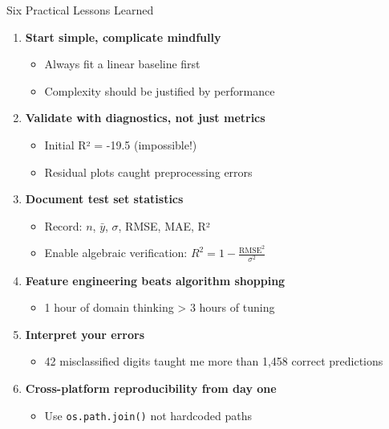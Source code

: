 \documentclass[aspectratio=169]{beamer}
\begin{document}
\begin{frame}{Six Practical Lessons Learned}

\begin{enumerate}
\item \textbf{Start simple, complicate mindfully}
\begin{itemize}
\item Always fit a linear baseline first
\item Complexity should be justified by performance
\end{itemize}

\item \textbf{Validate with diagnostics, not just metrics}
\begin{itemize}
\item Initial R² = -19.5 (impossible!)
\item Residual plots caught preprocessing errors
\end{itemize}

\item \textbf{Document test set statistics}
\begin{itemize}
\item Record: $n$, $\bar{y}$, $\sigma$, RMSE, MAE, R²
\item Enable algebraic verification: $R^2 = 1 - \frac{\text{RMSE}^2}{\sigma^2}$
\end{itemize}

\item \textbf{Feature engineering beats algorithm shopping}
\begin{itemize}
\item 1 hour of domain thinking > 3 hours of tuning
\end{itemize}

\item \textbf{Interpret your errors}
\begin{itemize}
\item 42 misclassified digits taught me more than 1,458 correct predictions
\end{itemize}

\item \textbf{Cross-platform reproducibility from day one}
\begin{itemize}
\item Use \texttt{os.path.join()} not hardcoded paths
\end{itemize}
\end{enumerate}

\end{frame}
\end{document}
